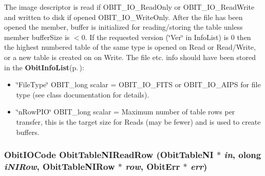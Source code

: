 The image descriptor is read if OBIT\_\-IO\_\-Read\-Only or OBIT\_\-IO\_\-Read\-Write and written to disk if opened OBIT\_\-IO\_\-Write\-Only. After the file has been opened the member, buffer is initialized for reading/storing the table unless member buffer\-Size is $<$0. If the requested version (\char`\"{}Ver\char`\"{} in Info\-List) is 0 then the highest numbered table of the same type is opened on Read or Read/Write, or a new table is created on on Write. The file etc. info should have been stored in the {\bf Obit\-Info\-List}{\rm (p.\,\pageref{structObitInfoList})}: \begin{itemize}
\item \char`\"{}File\-Type\char`\"{} OBIT\_\-long scalar = OBIT\_\-IO\_\-FITS or OBIT\_\-IO\_\-AIPS for file type (see class documentation for details). \item \char`\"{}n\-Row\-PIO\char`\"{} OBIT\_\-long scalar = Maximum number of table rows per transfer, this is the target size for Reads (may be fewer) and is used to create buffers. 
\end{itemize}
\subsubsection{\setlength{\rightskip}{0pt plus 5cm}Obit\-IOCode Obit\-Table\-NIRead\-Row ({\bf Obit\-Table\-NI} $\ast$ {\em in}, {\bf olong} {\em i\-NIRow}, {\bf Obit\-Table\-NIRow} $\ast$ {\em row}, {\bf Obit\-Err} $\ast$ {\em err})}\label{ObitTableNI_8h_a18}


